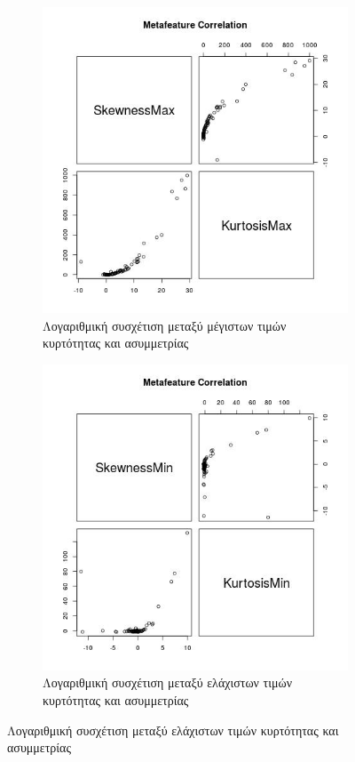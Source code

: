\documentclass[]{article}
\numberwithin{equation}{section}		%
\numberwithin{figure}{section}			%
\numberwithin{table}{section}				%
\begin{document}
    \begin{figure}[H] %
    	\begin{subfigure}{0.48\textwidth}
    		\includegraphics[width=\linewidth]{SkewnessMax_KurtosisMax_scatter.jpg}
    		\caption{Λογαριθμική συσχέτιση μεταξύ μέγιστων τιμών κυρτότητας και ασυμμετρίας} \label{fig:a}
    	\end{subfigure}\hspace*{\fill}
    	\begin{subfigure}{0.48\textwidth}
    		\includegraphics[width=\linewidth]{SkewnessMin_KurtosisMin_scatter.jpg}
    		\caption{Λογαριθμική συσχέτιση μεταξύ ελάχιστων τιμών κυρτότητας και ασυμμετρίας} \label{fig:b}
    	\end{subfigure}
    	

\end{figure}
\end{document}
